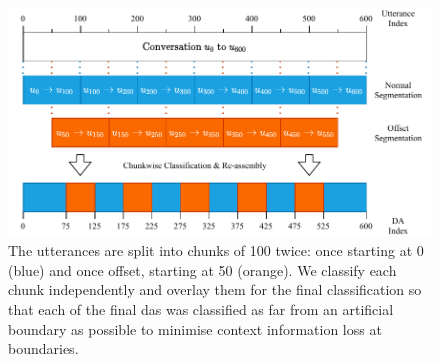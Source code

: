     \begin{figure}[h]
        \centering
        \includegraphics[width=\textwidth]{figures/chunks.pdf}
        \caption{The \glspl{utterance} are split into chunks of 100 twice: once starting at 0 (blue) and once offset, starting at 50 (orange). We classify each chunk independently and overlay them for the final classification so that each of the final \glspl{da} was classified as far from an artificial boundary as possible to minimise context information loss at boundaries.}
        \label{fig:chunking process}
    \end{figure}

